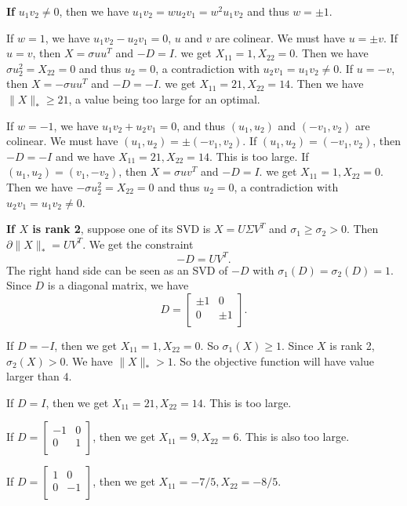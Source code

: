 \textbf{If} $u_1v_2\ne0$,
then we have $u_1v_2=wu_2v_1=w^2u_1v_2$
and thus $w=\pm1$.

If $w=1$,
we have $u_1v_2-u_2v_1=0$,
\ie $u$ and $v$ are colinear.
We must have $u=\pm v$.
If $u=v$,
then $X=\sigma uu^T$ and $-D=I$.
we get $X_{11}=1, X_{22}=0$.
Then we have $\sigma u_2^2=X_{22}=0$
and thus $u_2=0$,
a contradiction with $u_2v_1=u_1v_2\ne0$.
If $u=-v$,
then $X=-\sigma uu^T$ and $-D=-I$.
we get $X_{11}=21, X_{22}=14$.
Then we have $\|X\|_*\ge21$,
a value being too large for an optimal.

If $w=-1$,
we have $u_1v_2+u_2v_1=0$,
and thus $(u_1,u_2)$ and $(-v_1,v_2)$ are colinear.
We must have $(u_1,u_2)=\pm(-v_1,v_2)$.
If $(u_1,u_2)=(-v_1,v_2)$,
then $-D=-I$ and we have $X_{11}=21, X_{22}=14$.
This is too large.
If $(u_1,u_2)=(v_1,-v_2)$,
then $X=\sigma uv^T$ and $-D=I$.
we get $X_{11}=1, X_{22}=0$.
Then we have $-\sigma u_2^2=X_{22}=0$
and thus $u_2=0$,
a contradiction with $u_2v_1=u_1v_2\ne0$.

\textbf{If $X$ is rank 2},
suppose one of its SVD is $X=U\Sigma V^T$
and $\sigma_1\ge\sigma_2>0$.
Then $\partial\|X\|_*=UV^T$.
We get the constraint
\begin{equation}
    -D=UV^T.
\end{equation}
The right hand side can be seen as an SVD of $-D$
with $\sigma_1(D)=\sigma_2(D)=1$.
Since $D$ is a diagonal matrix,
we have
\begin{equation}
    D=
    \begin{bmatrix}
        \pm1 & 0    \\
        0    & \pm1 \\
    \end{bmatrix}.
\end{equation}

If $D=-I$,
then we get $X_{11}=1, X_{22}=0$.
So $\sigma_1(X)\ge1$.
Since $X$ is rank 2,
$\sigma_2(X)>0$.
We have $\|X\|_*>1$.
So the objective function will have value larger than $4$.

If $D=I$,
then we get $X_{11}=21, X_{22}=14$.
This is too large.

If $D=
    \begin{bmatrix}
        -1 & 0 \\
        0  & 1 \\
    \end{bmatrix}$,
then we get $X_{11}=9, X_{22}=6$.
This is also too large.

If $D=
    \begin{bmatrix}
        1 & 0  \\
        0 & -1 \\
    \end{bmatrix}$,
then we get $X_{11}=-7/5, X_{22}=-8/5$.
